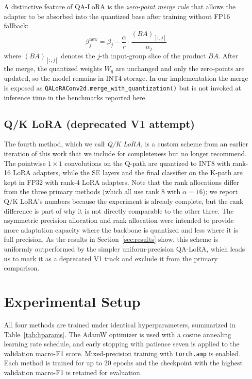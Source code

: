 \documentclass[conference]{IEEEtran}
\begin{document}
A distinctive feature of QA-LoRA is the \emph{zero-point merge rule} that allows the adapter to be absorbed into the quantized base after training without FP16 fallback:
\begin{equation}
\beta_j^{\text{new}} = \beta_j - \frac{\alpha}{r} \cdot \frac{(B A)_{[:,j]}}{\alpha_j}
\end{equation}
where $(BA)_{[:,j]}$ denotes the $j$-th input-group slice of the product $BA$. After the merge, the quantized weights $W_q$ are unchanged and only the zero-points are updated, so the model remains in INT4 storage. In our implementation the merge is exposed as \texttt{QALoRAConv2d.merge\_with\_quantization()} but is not invoked at inference time in the benchmarks reported here.

\subsection{Q/K LoRA (deprecated V1 attempt)}
The fourth method, which we call \emph{Q/K LoRA}, is a custom scheme from an earlier iteration of this work that we include for completeness but no longer recommend. The pointwise $1\times 1$ convolutions on the Q-path are quantized to INT8 with rank-16 LoRA adapters, while the SE layers and the final classifier on the K-path are kept in FP32 with rank-4 LoRA adapters. Note that the rank allocations differ from the three primary methods (which all use rank 8 with $\alpha=16$); we report Q/K LoRA's numbers because the experiment is already complete, but the rank difference is part of why it is not directly comparable to the other three. The asymmetric precision allocation and rank allocation were intended to provide more adaptation capacity where the backbone is quantized and less where it is full precision. As the results in Section~\ref{sec:results} show, this scheme is uniformly outperformed by the simpler uniform-precision QA-LoRA, which leads us to mark it as a deprecated V1 track and exclude it from the primary comparison.

\section{Experimental Setup}
All four methods are trained under identical hyperparameters, summarized in Table~\ref{tab:hparams}. The AdamW optimizer is used with a cosine annealing learning rate schedule, and early stopping with patience seven is applied to the validation macro-F1 score. Mixed-precision training with \texttt{torch.amp} is enabled. Each method is trained for up to 20 epochs and the checkpoint with the highest validation macro-F1 is retained for evaluation.
\end{document}

